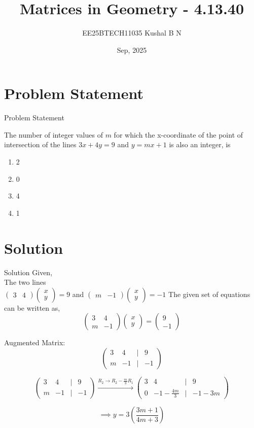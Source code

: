 \documentclass{beamer}
\title{Matrices in Geometry - 4.13.40}
\author{EE25BTECH11035 Kushal B N}
\date{Sep, 2025}
\providecommand{\brak}[1]{\ensuremath{\left(#1\right)}}
\theoremstyle{remark}
\newcommand{\myvec}[1]{\ensuremath{\begin{pmatrix}#1\end{pmatrix}}}
\begin{document}
\maketitle

\section{Problem Statement}
\begin{frame}{Problem Statement}

The number of integer values of $m$ for which the x-coordinate of the point of intersection of the lines $3x + 4y = 9$ and $y = mx + 1$ is also an integer, is
  \begin{enumerate}
    \item 2
    \item 0
    \item 4
    \item 1
  \end{enumerate}
\end{frame}

\section{Solution}
\begin{frame}{Solution}
Given,\\
The two lines\\
$\myvec{3&4}\myvec{x\\y}=9$ and $\myvec{m&-1}\myvec{x\\y}=-1$
The given set of equations can be written as,
\begin{equation}
    \myvec{3&4\\m&-1}\myvec{x\\y} = \myvec{9\\-1}
\end{equation}

Augmented Matrix:
\begin{equation}
    \myvec{3&4&|&9\\m&-1&|&-1}
\end{equation}

\begin{equation}
    \myvec{3&4&|&9\\m&-1&|&-1} \overset{R_2 \rightarrow R_2 - \frac{m}{3}R_1}{\longrightarrow} \myvec{3&4&|&9\\0&-1-\frac{4m}{3}&|&-1-3m}
\end{equation}

\begin{equation}
    \implies y = 3\brak{\frac{3m+1}{4m+3}}
\end{equation}
\end{frame}
\end{document}

